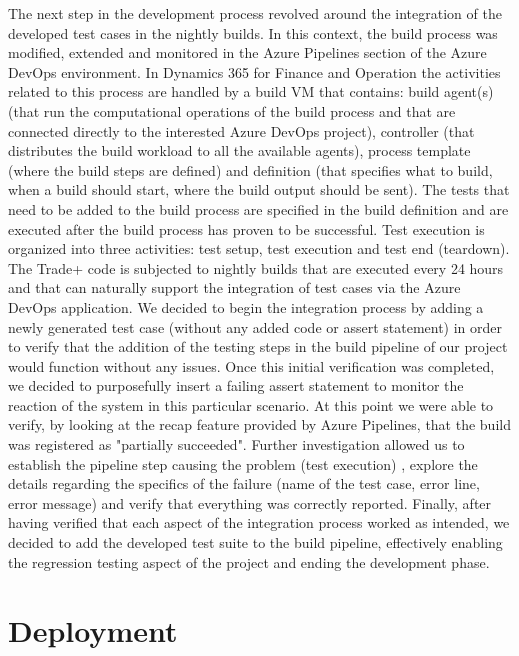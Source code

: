The next step in the development process revolved around the integration of the developed test cases in the nightly builds. In this context, the build process was modified, extended and monitored in the Azure Pipelines section of the Azure DevOps environment. In Dynamics 365 for Finance and Operation the activities related to this process are handled by a build VM that contains: build agent(s) (that run the computational operations of the build process and that are connected directly to the interested Azure DevOps project), controller (that distributes the build workload to all the available agents), process template (where the build steps are defined) and definition (that specifies what to build, when a build should start, where the build output should be sent). The tests that need to be added to the build process are specified in the build definition and are executed after the build process has proven to be successful. Test execution is organized into three activities: test setup, test execution and test end (teardown). The Trade+ code is subjected to nightly builds that are executed every 24 hours and that can naturally support the integration of test cases via the Azure DevOps application. We decided to begin the integration process by adding a newly generated test case (without any added code or assert statement) in order to verify that the addition of the testing steps in the build pipeline of our project would function without any issues. Once this initial verification was completed, we decided to purposefully insert a failing assert statement to monitor the reaction of the system in this particular scenario. At this point we were able to verify, by looking at the recap feature provided by Azure Pipelines, that the build was registered as "partially succeeded". Further investigation allowed us to establish the pipeline step causing the problem (test execution) , explore the details regarding the specifics of the failure (name of the test case, error line, error message) and verify that everything was correctly reported. Finally, after having verified that each aspect of the integration process worked as intended, we decided to add the developed test suite to the build pipeline, effectively enabling the regression testing aspect of the project and ending the development phase.

\enlargethispage{-\baselineskip}
\enlargethispage{-\baselineskip}

\section{Deployment}

